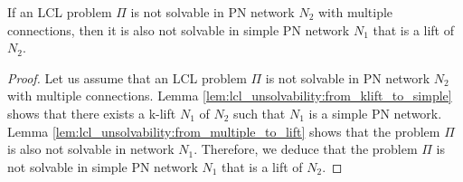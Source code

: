 

%
\begin{lemma} \label{lem:lcl_unsolvability:from_multiple_to_simple}
    If an LCL problem $\Pi$ is not solvable in PN network $N_2$ with multiple connections, then it is also not solvable in simple PN network $N_1$ that is a lift of $N_2$.
\end{lemma}
\begin{proof}
    Let us assume that an LCL problem $\Pi$ is not solvable in PN network $N_2$ with multiple connections.
    Lemma \ref{lem:lcl_unsolvability:from_klift_to_simple} shows that there exists a k-lift $N_1$ of $N_2$ such that $N_1$ is a simple PN network.
    Lemma \ref{lem:lcl_unsolvability:from_multiple_to_lift} shows that the problem $\Pi$ is also not solvable in network $N_1$.
    Therefore, we deduce that the problem $\Pi$ is not solvable in simple PN network $N_1$ that is a lift of $N_2$.
\end{proof}

